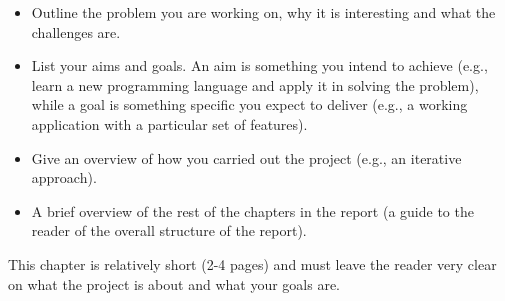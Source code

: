 \begin{itemize}
\item Outline the problem you are working on, why it is interesting and
what the challenges are.
\item List your aims and goals. An aim is something you intend to achieve (e.g., learn a new programming language and apply it in solving the problem), while a goal is something specific you expect to deliver (e.g., a working application with a particular set of features).
\item Give an overview of how you carried out the project (e.g., an iterative approach).
\item A brief overview of the rest of the chapters in the report (a guide to the reader of the overall structure of the report).
\end{itemize}
This chapter is relatively short (2-4 pages) and must leave the reader very clear on what the project is about and what your goals are.